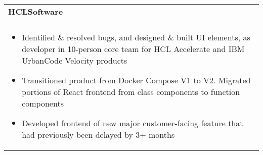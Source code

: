 \documentclass[letterpaper,10pt]{article} %
\begin{document}
\begin{tabular*}{\linewidth}{@{\extracolsep{\fill}} lr }
\textbf{HCLSoftware} & \scriptsize\bfseries\color{sectioncolour}{Remote}\\
\footnotesize\bfseries\color{sectioncolour}{Software Engineer Intern} & \scriptsize\bfseries\color{sectioncolour}{May 2023 - August 2023}\\
\multicolumn{2}{p{\linewidth}}{
    \scriptsize{\vspace{-0.1in}\begin{itemize}
        \item Identified \& resolved bugs, and designed \& built UI elements, as developer in 10-person core team for HCL Accelerate and IBM UrbanCode Velocity products
        \item Transitioned product from Docker Compose V1 to V2. Migrated portions of React frontend from class components to function components
        \item Developed frontend of new major customer-facing feature that had previously been delayed by 3+ months
    \end{itemize}\vspace{-0.0in}}
}\\


\end{tabular*}
\end{document}
